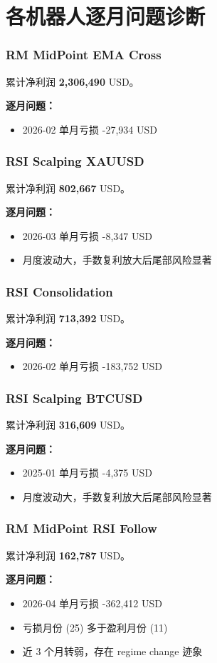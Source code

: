 \documentclass[11pt,a4paper]{ctexart}
\begin{document}
    \section{各机器人逐月问题诊断}
    \subsubsection{RM MidPoint EMA Cross}
累计净利润 \textbf{2,306,490} USD。\par\noindent\textbf{逐月问题：}\begin{itemize}\setlength\itemsep{2pt}
\item 2026-02 单月亏损 -27,934 USD\end{itemize}
\subsubsection{RSI Scalping XAUUSD}
累计净利润 \textbf{802,667} USD。\par\noindent\textbf{逐月问题：}\begin{itemize}\setlength\itemsep{2pt}
\item 2026-03 单月亏损 -8,347 USD\item 月度波动大，手数复利放大后尾部风险显著\end{itemize}
\subsubsection{RSI Consolidation}
累计净利润 \textbf{713,392} USD。\par\noindent\textbf{逐月问题：}\begin{itemize}\setlength\itemsep{2pt}
\item 2026-02 单月亏损 -183,752 USD\end{itemize}
\subsubsection{RSI Scalping BTCUSD}
累计净利润 \textbf{316,609} USD。\par\noindent\textbf{逐月问题：}\begin{itemize}\setlength\itemsep{2pt}
\item 2025-01 单月亏损 -4,375 USD\item 月度波动大，手数复利放大后尾部风险显著\end{itemize}
\subsubsection{RM MidPoint RSI Follow}
累计净利润 \textbf{162,787} USD。\par\noindent\textbf{逐月问题：}\begin{itemize}\setlength\itemsep{2pt}
\item 2026-04 单月亏损 -362,412 USD\item 亏损月份 (25) 多于盈利月份 (11)\item 近 3 个月转弱，存在 regime change 迹象\end{itemize}
\end{document}
